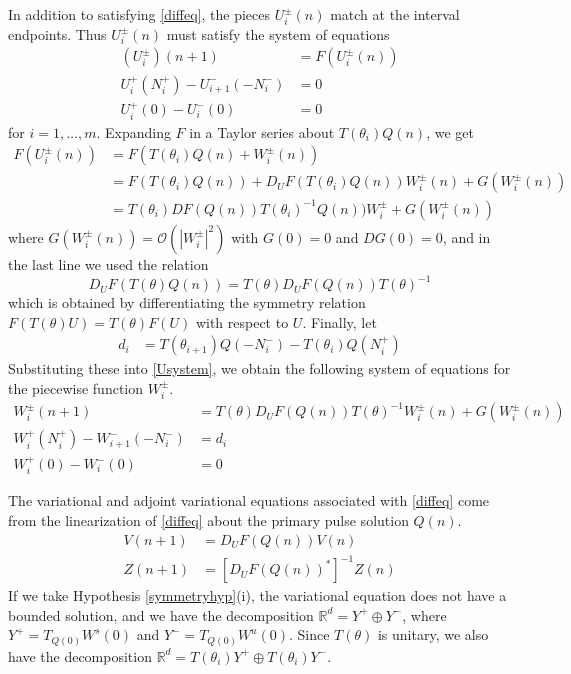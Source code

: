 \documentclass[12pt]{article}
\def\R{{\mathbb R}}
\begin{document}
In addition to satisfying \eqref{diffeq}, the pieces $U_i^\pm(n)$ match at the interval endpoints. Thus $U_i^\pm(n)$ must satisfy the system of equations
\begin{equation}\label{Usystem}
\begin{aligned}
(U_i^\pm)(n+1) &= F(U_i^\pm(n))  \\
U_i^+(N_i^+) - U_{i+1}^-(-N_i^-) &= 0 \\
U_i^+(0) - U_i^-(0) &= 0
\end{aligned}
\end{equation}
for $i = 1, \dots, m$. Expanding $F$ in a Taylor series about $T(\theta_i) Q(n)$, we get
\begin{align*}
F(U_i^\pm(n)) &= F(T(\theta_i) Q(n) + W_i^\pm(n)) \\
&= F(T(\theta_i) Q(n)) + D_U F(T(\theta_i) Q(n)) W_i^\pm(n) + G(W_i^\pm(n)) \\
&= T(\theta_i)DF(Q(n))T(\theta_i)^{-1} Q(n)) W_i^\pm + G(W_i^\pm(n))
\end{align*}
where $G(W_i^\pm(n)) = \mathcal{O}(|W_i^\pm|^2)$ with $G(0) = 0$ and $DG(0) = 0$, and in the last line we used the relation
\begin{equation}\label{DFtheta}
D_U F(T(\theta)Q(n)) = T(\theta) D_U F(Q(n))T(\theta)^{-1}
\end{equation}
which is obtained by differentiating the symmetry relation $F(T(\theta)U) = T(\theta)F(U)$ with respect to $U$. Finally, let
\begin{align} \label{didef}
d_i &= T(\theta_{i+1}) Q(-N_i^-) - T(\theta_i) Q(N_i^+)
\end{align}
Substituting these into \eqref{Usystem}, we obtain the following system of equations for the piecewise function $W_i^\pm$.
\begin{align}
W_i^\pm(n+1) &= T(\theta)D_U F(Q(n))T(\theta)^{-1} W_i^\pm(n) + G(W_i^\pm(n)) \label{Wsystem1} \\
W_i^+(N_i^+) - W_{i+1}^-(-N_i^-) &= d_i \label{Wsystem2} \\
W_i^+(0) - W_i^-(0) &= 0 \label{Wsystem3}
\end{align}

The variational and adjoint variational equations associated with \eqref{diffeq} come from the linearization of \eqref{diffeq} about the primary pulse solution $Q(n)$.
\begin{align}
V(n+1) &= D_U F(Q(n)) V(n) \label{vareq} \\
Z(n+1) &= [D_U F(Q(n))^*]^{-1} Z(n) \label{adjvareq} 
\end{align}
If we take Hypothesis \ref{symmetryhyp}(i), the variational equation does not have a bounded solution, and we have the decomposition $\R^d = Y^+ \oplus Y^-$, where $Y^+ = T_{Q(0)} W^s(0)$ and $Y^- = T_{Q(0)} W^u(0)$. Since $T(\theta)$ is unitary, we also have the decomposition $\R^d = T(\theta_i) Y^+ \oplus T(\theta_i) Y^-$.
\end{document}
